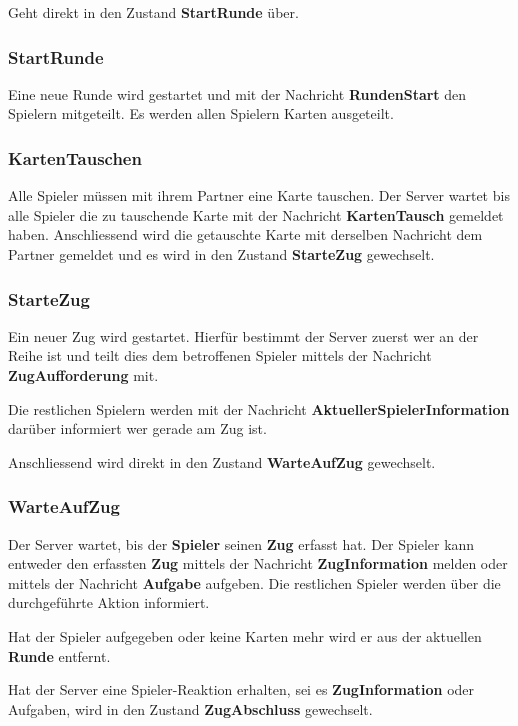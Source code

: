 \documentclass[12pt,halfparskip]{scrartcl}
\begin{document}
Geht direkt in den Zustand \textbf{StartRunde} über.

\subsubsection{StartRunde}
\label{ssub:startrunde}
Eine neue Runde wird gestartet und mit der Nachricht \textbf{RundenStart} den Spielern mitgeteilt. Es werden allen Spielern Karten ausgeteilt.

\subsubsection{KartenTauschen}
\label{ssub:kartentauschen}
Alle Spieler müssen mit ihrem Partner eine Karte tauschen. Der Server wartet bis alle Spieler die zu tauschende Karte mit der Nachricht \textbf{KartenTausch} gemeldet haben. Anschliessend wird die getauschte Karte mit derselben Nachricht dem Partner gemeldet und es wird in den Zustand \textbf{StarteZug} gewechselt.

\subsubsection{StarteZug}
\label{ssub:startezug}
Ein neuer Zug wird gestartet. Hierfür bestimmt der Server zuerst wer an der Reihe ist und teilt dies dem betroffenen Spieler mittels der Nachricht \textbf{ZugAufforderung} mit. 

Die restlichen Spielern werden mit der Nachricht \textbf{AktuellerSpielerInformation} darüber informiert wer gerade am Zug ist.

Anschliessend wird direkt in den Zustand \textbf{WarteAufZug} gewechselt.

\subsubsection{WarteAufZug}
\label{ssub:warteaufzug}
Der Server wartet, bis der \textbf{Spieler} seinen \textbf{Zug} erfasst hat. Der Spieler kann entweder den erfassten \textbf{Zug} mittels der Nachricht \textbf{ZugInformation} melden oder mittels der Nachricht \textbf{Aufgabe} aufgeben. Die restlichen Spieler werden über die durchgeführte Aktion informiert.

Hat der Spieler aufgegeben oder keine Karten mehr wird er aus der aktuellen \textbf{Runde} entfernt.

Hat der Server eine Spieler-Reaktion erhalten, sei es \textbf{ZugInformation} oder Aufgaben, wird in den Zustand \textbf{ZugAbschluss} gewechselt.
\end{document}
